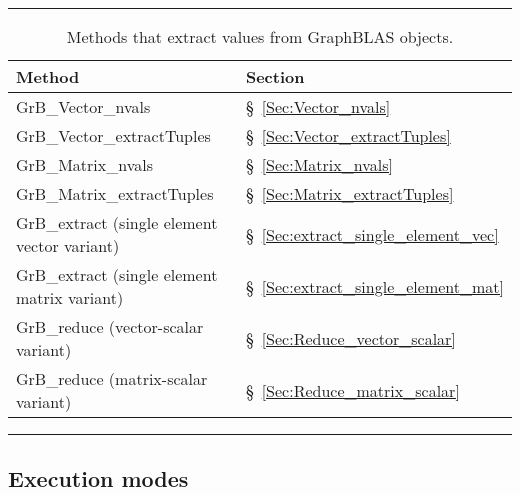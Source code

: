 \begin{table}[htb]
	\hrule
	\begin{center}
		\caption{Methods that extract values from GraphBLAS objects.}
		\label{Tab:ExtractMethods}

		\begin{tabular}{l|l}
			Method	& Section \\ \hline

			{\sf GrB\_Vector\_nvals}		& \S~\ref{Sec:Vector_nvals}		\\
			{\sf GrB\_Vector\_extractTuples}	& \S~\ref{Sec:Vector_extractTuples}	\\
			{\sf GrB\_Matrix\_nvals}		& \S~\ref{Sec:Matrix_nvals}		\\
			{\sf GrB\_Matrix\_extractTuples}	& \S~\ref{Sec:Matrix_extractTuples}	\\
			{\sf GrB\_extract} (single element vector variant)	& \S~\ref{Sec:extract_single_element_vec}	\\
			{\sf GrB\_extract} (single element matrix variant)	& \S~\ref{Sec:extract_single_element_mat}	\\
			{\sf GrB\_reduce} (vector-scalar variant)		& \S~\ref{Sec:Reduce_vector_scalar}		\\
			{\sf GrB\_reduce} (matrix-scalar variant)		& \S~\ref{Sec:Reduce_matrix_scalar}		\\
		\end{tabular}
	\end{center}
	\hrule
\end{table}

\subsection{Execution modes}

